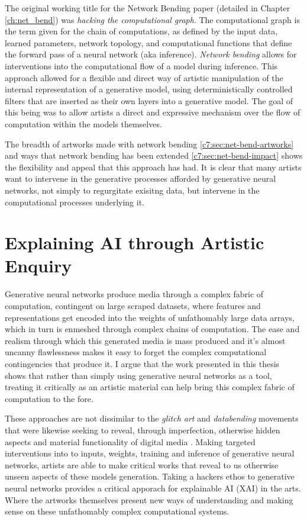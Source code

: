 The original working title for the Network Bending paper (detailed in Chapter \ref{ch:net_bend}) was \textit{hacking the computational graph}.
The computational graph is the term given for the chain of computations, as defined by the input data, learned parameters, network topology, and computational functions that define the forward pass of a neural network (aka inference). \textit{Network bending} allows for interventions into the computational flow of a model during inference. 
This approach allowed for a flexible and direct way of artistic manipulation of the internal representation of a generative model, using deterministically controlled filters that are inserted as their own layers into a generative model.
The goal of this being was to allow artists a direct and expressive mechanism over the flow of computation within the models themselves.

The breadth of artworks made with network bending \ref{c7:sec:net-bend-artworks} and ways that network bending has been extended \ref{c7:sec:net-bend-impact} shows the flexibility and appeal that this approach has had.
It is clear that many artists want to intervene in the generative processes afforded by generative neural networks, not simply to regurgitate exisitng data, but intervene in the computational processes underlying it.

\section{Explaining AI through Artistic Enquiry}
\label{c8:sec:explaining}

Generative neural networks produce media through a complex fabric of computation, contingent on large scraped datasets, where features and representations get encoded into the weights of unfathomably large data arrays, which in turn is enmeshed through complex chains of computation. 
The ease and realism through which this generated media is mass produced and it's almost uncanny flawlessness \cite{smith2023ai} makes it easy to forget the complex computational contingencies that produce it. 
I argue that the work presented in this thesis shows that rather than simply using generative neural networks as a tool, treating it critically as an artistic material can help bring this complex fabric of computation to the fore. 

These approaches are not dissimilar to the \textit{glitch art} and \textit{databending} movements that were likewise seeking to reveal, through imperfection, otherwise hidden aspects and material functionality of digital media \cite{kemper2023glitch}.
Making targeted interventions into to inputs, weights, training and inference of generative neural networks, artists are able to make critical works that reveal to us otherwise unseen aspects of these models generation. 
Taking a hackers ethos to generative neural networks provides a critical apporach for explainable AI (XAI) in the arts.
Where the artworks themselves present new ways of understanding and making sense on these unfathomably complex computational systems. 